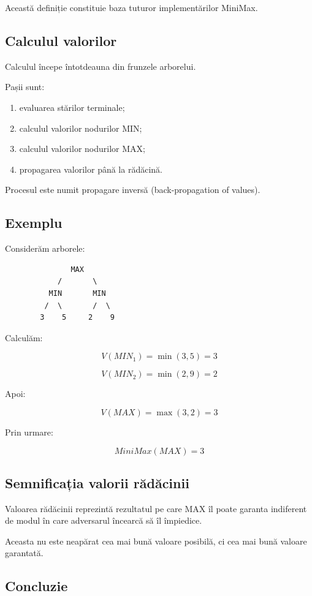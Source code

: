 \documentclass[12pt,a4paper]{article}
\begin{document}
Această definiție constituie baza tuturor implementărilor MiniMax.

\subsection{Calculul valorilor}

Calculul începe întotdeauna din frunzele arborelui.

Pașii sunt:

\begin{enumerate}
\item evaluarea stărilor terminale;
\item calculul valorilor nodurilor MIN;
\item calculul valorilor nodurilor MAX;
\item propagarea valorilor până la rădăcină.
\end{enumerate}

Procesul este numit propagare inversă (back-propagation of values).

\subsection{Exemplu}

Considerăm arborele:

\begin{verbatim}
               MAX
            /       \
          MIN       MIN
         /  \       /  \
        3    5     2    9
\end{verbatim}

Calculăm:

\[
V(MIN_1)=\min(3,5)=3
\]

\[
V(MIN_2)=\min(2,9)=2
\]

Apoi:

\[
V(MAX)=\max(3,2)=3
\]

Prin urmare:

\[
MiniMax(MAX)=3
\]

\subsection{Semnificația valorii rădăcinii}

Valoarea rădăcinii reprezintă rezultatul pe care MAX îl poate garanta indiferent de modul în care adversarul încearcă să îl împiedice.

Aceasta nu este neapărat cea mai bună valoare posibilă, ci cea mai bună valoare garantată.

\subsection{Concluzie}
\end{document}
